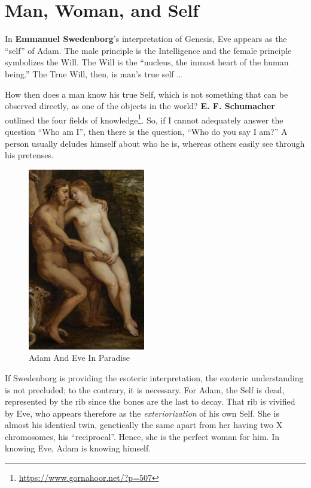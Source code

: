 \section{Man, Woman, and Self}

In \textbf{Emmanuel Swedenborg}'s interpretation of Genesis, Eve appears as the “self” of Adam. The male principle is the Intelligence and the female principle symbolizes the Will. The Will is the “nucleus, the inmost heart of the human being.” The True Will, then, is man's true self …

How then does a man know his true Self, which is not something that can be observed directly, as one of the objects in the world? \textbf{E. F. Schumacher} outlined the four fields of knowledge\footnote{\url{https://www.gornahoor.net/?p=507}}. So, if I cannot adequately answer the question “Who am I”, then there is the question, “Who do you say I am?” A person usually deludes himself about who he is, whereas others easily see through his pretenses.

\begin{figure}\centering
 \includegraphics[scale=.7]{a20120908ManWomanandSelf-img001.jpg} 
 \caption{Adam And Eve In Paradise}
\end{figure}

If Swedenborg is providing the esoteric interpretation, the exoteric understanding is not precluded; to the contrary, it is necessary. For Adam, the Self is dead, represented by the rib since the bones are the last to decay. That rib is vivified by Eve, who appears therefore as the \emph{exteriorization} of his own Self. She is almost his identical twin, genetically the same apart from her having two X chromosomes, his “reciprocal”. Hence, she is the perfect woman for him. In knowing Eve, Adam is knowing himself.

